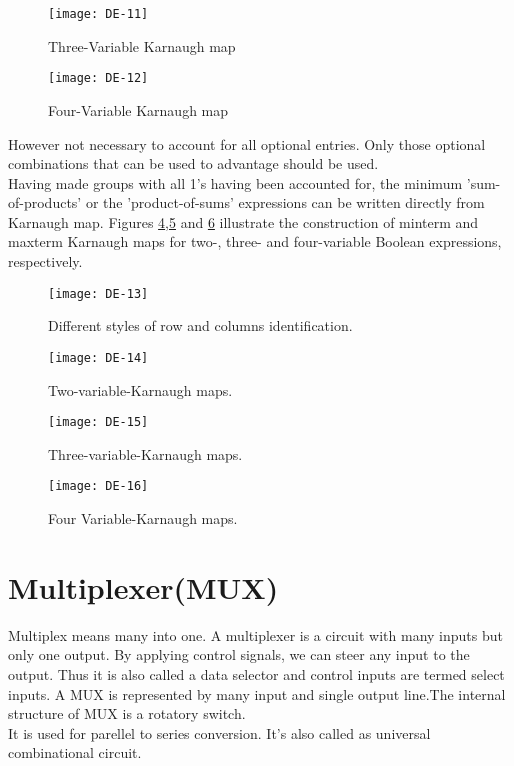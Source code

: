 \begin{minipage}{0.45\textwidth}
	\begin{figure}[H]
		\centering
		\texttt{[image: DE-11]}
		\caption{Three-Variable Karnaugh map}
		\label{3-variable K map}
	\end{figure}
\end{minipage}
\begin{figure}[H]
	\centering
	\texttt{[image: DE-12]}
	\caption{Four-Variable Karnaugh map}
	\label{4-variable K map}
\end{figure}
However not necessary to account for all optional entries. Only those optional combinations that can be used to advantage should be used.\\
Having made groups with all 1's having been accounted for, the minimum 'sum-of-products' or the 'product-of-sums' expressions can be written directly from Karnaugh map. Figures \ref{2-variable K map sop},\ref{3-variable K map sop} and \ref{4-variable K map sop} illustrate the construction of minterm and maxterm Karnaugh maps for two-, three- and four-variable Boolean expressions, respectively.
\begin{figure}[H]
	\centering
	\texttt{[image: DE-13]}
	\caption{Different styles of row and columns identification.}
	\label{}
\end{figure}
\begin{figure}[H]
	\centering
	\texttt{[image: DE-14]}
	\caption{Two-variable-Karnaugh maps.}
	\label{2-variable K map sop}
\end{figure}
\begin{figure}[H]
	\centering
	\texttt{[image: DE-15]}
	\caption{Three-variable-Karnaugh maps.}
	\label{3-variable K map sop}
\end{figure}
\begin{figure}[H]
	\centering
	\texttt{[image: DE-16]}
	\caption{Four Variable-Karnaugh maps.}
	\label{4-variable K map sop}
\end{figure}

\section{Multiplexer(MUX)}
Multiplex means many into one. A multiplexer is a circuit with many inputs but only one output. By applying control signals, we can steer any input to the output. Thus it is also called a data selector and control inputs are termed select inputs. A MUX is represented by many input and single output line.The internal structure of MUX is a rotatory switch.
\\ It is used for parellel to series conversion. It's also called as universal combinational circuit.

